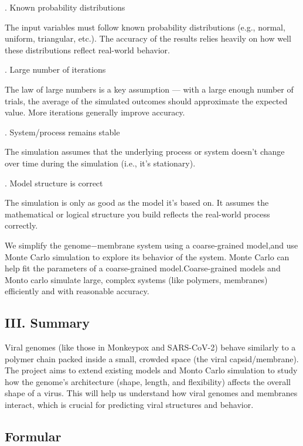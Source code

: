 \documentclass[12pt]{article}
\begin{document}
\begin{flushleft}
. Known probability distributions
    
The input variables must follow known probability distributions (e.g., normal, uniform, triangular, etc.). The accuracy of the results relies heavily on how well these distributions reflect real-world behavior.

. Large number of iterations
    
The law of large numbers is a key assumption — with a large enough number of trials, the average of the simulated outcomes should approximate the expected value. More iterations generally improve accuracy.

. System/process remains stable
    
The simulation assumes that the underlying process or system doesn’t change over time during the simulation (i.e., it's stationary).

. Model structure is correct

The simulation is only as good as the model it's based on. It assumes the mathematical or logical structure you build reflects the real-world process correctly.


We simplify the genome$-$membrane system using a coarse-grained model,and use Monte Carlo simulation to explore its behavior of the system. Monte Carlo can help fit the parameters of a coarse-grained model.Coarse-grained models and Monto carlo simulate large, complex systems (like polymers, membranes) efficiently and with reasonable accuracy.




\subsection*{III. Summary}
Viral genomes (like those in Monkeypox and SARS-CoV-2) behave similarly to a polymer chain packed inside a small, crowded space (the viral capsid/membrane). The project aims to extend existing models and Monto Carlo simulation to study how the genome's architecture (shape, length, and flexibility) affects the overall shape of a virus. This will help us understand how viral genomes and membranes interact, which is crucial for predicting viral structures and behavior.



\subsection*{Formular}


\end{flushleft}
\end{document}
